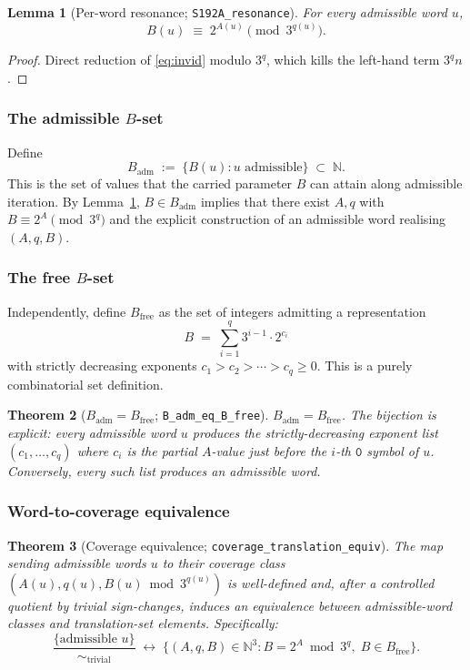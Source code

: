 \documentclass[11pt,a4paper]{article}
\theoremstyle{plain}
\newtheorem{theorem}{Theorem}[section]
\newtheorem{lemma}[theorem]{Lemma}
\theoremstyle{definition}
\newcommand{\NN}{\mathbb{N}}
\begin{document}
\begin{lemma}[Per-word resonance; \texttt{S192A\_resonance}]
\label{lem:per-word-resonance}
For every admissible word $u$,
\[
   B(u) \;\equiv\; 2^{A(u)} \pmod{3^{q(u)}}.
\]
\end{lemma}

\begin{proof}
Direct reduction of \eqref{eq:invid} modulo $3^q$, which kills the
left-hand term $3^q n$.
\end{proof}

\subsubsection*{The admissible $B$-set}

Define
\[
   B_{\mathrm{adm}} \;:=\; \bigl\{ B(u) : u \text{ admissible} \bigr\} \;\subset\; \NN.
\]
This is the set of values that the carried parameter $B$ can attain
along admissible iteration. By Lemma~\ref{lem:per-word-resonance},
$B \in B_{\mathrm{adm}}$ implies that there exist $A, q$ with
$B \equiv 2^A \pmod{3^q}$ and the explicit construction of an
admissible word realising $(A, q, B)$.

\subsubsection*{The free $B$-set}

Independently, define $B_{\mathrm{free}}$ as the set of integers
admitting a representation
\[
   B \;=\; \sum_{i = 1}^{q} 3^{i-1} \cdot 2^{c_i}
\]
with strictly decreasing exponents $c_1 > c_2 > \cdots > c_q \ge 0$.
This is a purely combinatorial set definition.

\begin{theorem}[$B_{\mathrm{adm}} = B_{\mathrm{free}}$;
\texttt{B\_adm\_eq\_B\_free}]
\label{thm:B-adm-free}
$B_{\mathrm{adm}} = B_{\mathrm{free}}$. The bijection is explicit:
every admissible word $u$ produces the strictly-decreasing exponent
list $(c_1, \ldots, c_q)$ where $c_i$ is the partial $A$-value just
before the $i$-th $\mathtt{0}$ symbol of $u$. Conversely, every
such list produces an admissible word.
\end{theorem}

\subsubsection*{Word-to-coverage equivalence}

\begin{theorem}[Coverage equivalence;
\texttt{coverage\_translation\_equiv}]
\label{thm:coverage-equiv}
The map sending admissible words $u$ to their coverage class
$(A(u), q(u), B(u) \bmod 3^{q(u)})$ is well-defined and, after a
controlled quotient by trivial sign-changes, induces an
equivalence between admissible-word classes and translation-set
elements. Specifically:
\[
   \frac{\{\text{admissible } u\}}{\sim_{\mathrm{trivial}}}
   \;\longleftrightarrow\;
   \{(A, q, B) \in \NN^3 : B = 2^A \bmod 3^q,\; B \in B_{\mathrm{free}}\}.
\]
\end{theorem}
\end{document}
